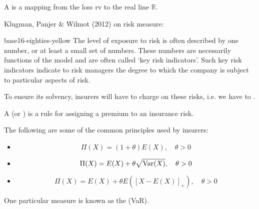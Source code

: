 \documentclass[notoc,notitlepage]{tufte-book}
\begin{document}
\begin{defn}
\label{defn:risk_measure}
  A  is a mapping from the loss rv to the real line $\mathbb{R}$.
\end{defn}

Klugman, Panjer \& Wilmot (2012) \cite{KlugmanPanjerWillmot2012} on risk measure:

\begin{quotebox}{base16-eighties-yellow}
  The level of exposure to risk is often described by one number, or at least a small set of numbers. These numbers are necessarily functions of the model and are often called ‘key risk indicators’. Such key risk indicators indicate to risk managers the degree to which the company is subject to particular aspects of risk.
\end{quotebox}

To ensure its solvency, insurers will have to charge on these risks, i.e. we have to .

\begin{defn}
\label{defn:premium_principle}
  A  (or ) is a rule for assigning a premium to an insurance risk.
\end{defn}

\begin{note}
  The following are some of the common principles used by insurers:
  \begin{itemize}
    \item {}
      \begin{equation*}
        \Pi(X) = ( 1 + \theta ) E(X), \quad \theta > 0
      \end{equation*}
    \item {}
      \begin{equation*}
        \Pi(X) = E(X) + \theta \sqrt{\operatorname{Var}(X)}, \quad \theta > 0
      \end{equation*}
    \item {}
      \begin{equation*}
        \Pi(X) = E(X) + \theta E( [ X - E(X) ]_+ ), \quad \theta > 0
      \end{equation*}
  \end{itemize}
\end{note}

One particular measure is known as the  (VaR).
\end{document}
